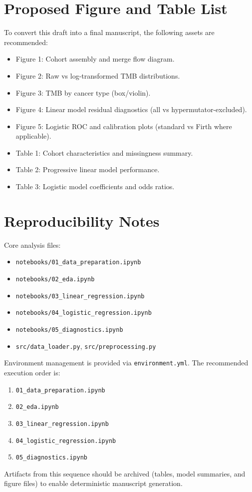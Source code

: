 \documentclass[11pt]{article}
\begin{document}
\section{Proposed Figure and Table List}
To convert this draft into a final manuscript, the following assets are recommended:
\begin{itemize}
    \item Figure 1: Cohort assembly and merge flow diagram.
    \item Figure 2: Raw vs log-transformed TMB distributions.
    \item Figure 3: TMB by cancer type (box/violin).
    \item Figure 4: Linear model residual diagnostics (all vs hypermutator-excluded).
    \item Figure 5: Logistic ROC and calibration plots (standard vs Firth where applicable).
    \item Table 1: Cohort characteristics and missingness summary.
    \item Table 2: Progressive linear model performance.
    \item Table 3: Logistic model coefficients and odds ratios.
\end{itemize}

\section{Reproducibility Notes}
Core analysis files:
\begin{itemize}
    \item \texttt{notebooks/01\_data\_preparation.ipynb}
    \item \texttt{notebooks/02\_eda.ipynb}
    \item \texttt{notebooks/03\_linear\_regression.ipynb}
    \item \texttt{notebooks/04\_logistic\_regression.ipynb}
    \item \texttt{notebooks/05\_diagnostics.ipynb}
    \item \texttt{src/data\_loader.py}, \texttt{src/preprocessing.py}
\end{itemize}

Environment management is provided via \texttt{environment.yml}. The recommended execution order is:
\begin{enumerate}
    \item \texttt{01\_data\_preparation.ipynb}
    \item \texttt{02\_eda.ipynb}
    \item \texttt{03\_linear\_regression.ipynb}
    \item \texttt{04\_logistic\_regression.ipynb}
    \item \texttt{05\_diagnostics.ipynb}
\end{enumerate}
Artifacts from this sequence should be archived (tables, model summaries, and figure files) to enable deterministic manuscript generation.
\end{document}
